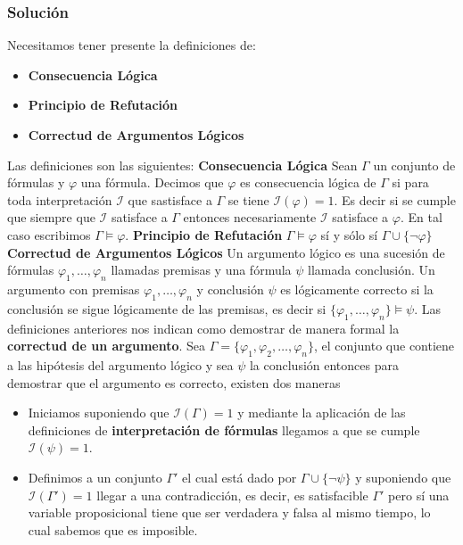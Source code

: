 \documentclass[a4paper]{article}
\begin{document}
\subsubsection{Solución}
Necesitamos tener presente la definiciones de:
\begin{itemize}
    \item \textbf{Consecuencia Lógica}
    \item \textbf{Principio de Refutación}
    \item \textbf{Correctud de Argumentos Lógicos}
\end{itemize}
Las definiciones son las siguientes:
\newline 
\textbf{Consecuencia Lógica}
\newline
Sean $\Gamma$ un conjunto de f\'ormulas y $\varphi$ una f\'ormula. Decimos 
que $\varphi$ es consecuencia l\'ogica de $\Gamma$ si para toda interpretaci\'on 
$\mathcal{I}$ que sastisface a $\Gamma$ se tiene $\mathcal{I}(\varphi)=1$. 
Es decir si se cumple que siempre que $\mathcal{I}$ satisface a $\Gamma$ entonces 
necesariamente $\mathcal{I}$ satisface a $\varphi$.
En tal caso escribimos $\Gamma\models\varphi$.
\newline 
\textbf{Principio de Refutación}
\newline
$\Gamma\models\varphi$ sí y sólo sí $\Gamma\cup\{\lnot\varphi\}$
\newline
\textbf{Correctud de Argumentos Lógicos}
\newline 
Un argumento l\'ogico es una sucesi\'on de f\'ormulas 
$\varphi_1,\ldots,\varphi_n$ llamadas premisas y una f\'ormula $\psi$ llamada 
conclusi\'on.
\newline
Un argumento con premisas $\varphi_1,\ldots,\varphi_n$ y conclusi\'on $\psi$ es
l\'ogicamente correcto si la conclusi\'on se sigue l\'ogicamente de las 
premisas, es decir si $\{\varphi_1,\ldots,\varphi_n\}\models\psi$.
\newline
Las definiciones anteriores nos indican como demostrar de manera formal la \textbf{correctud de un
argumento}. Sea \(\Gamma = \{\varphi_1, \varphi_2, \dotsc, \varphi_n\}\), el conjunto que contiene
a las hipótesis del argumento lógico y sea \(\psi\) la conclusión entonces para demostrar que el 
argumento es correcto, existen dos maneras
\begin{itemize}
    \item Iniciamos suponiendo que \(\mathcal{I}\left(\Gamma\right) = 1\) y mediante la aplicación 
    de las definiciones de \textbf{interpretación de fórmulas} llegamos a que se cumple 
    \(\mathcal{I}\left(\psi\right) = 1\).
    \item Definimos a un conjunto \(\Gamma'\) el cual está dado por \(\Gamma \cup \{\neg \psi\}\)
    y suponiendo que \(\mathcal{I}\left(\Gamma'\right) = 1\) llegar a una contradicción, es decir,
    es satisfacible \(\Gamma'\) pero sí una variable proposicional tiene que ser verdadera y 
    falsa al mismo tiempo, lo cual sabemos que es imposible.
\end{itemize}
\end{document}
